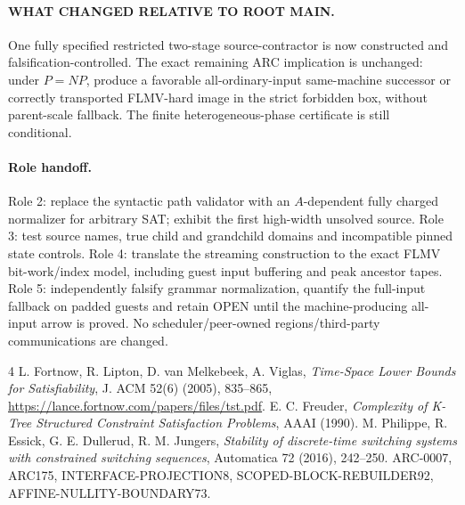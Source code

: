 \documentclass[11pt]{article}
\begin{document}
\paragraph{WHAT CHANGED RELATIVE TO ROOT MAIN.}
One fully specified restricted two-stage source-contractor is now
constructed and falsification-controlled. The exact remaining ARC
implication is unchanged: under $P=NP$, produce a favorable 
all-ordinary-input same-machine successor or correctly transported
FLMV-hard image in the strict forbidden box, without parent-scale fallback.
The finite heterogeneous-phase certificate is still conditional.

\paragraph{Role handoff.}
Role 2: replace the syntactic path validator with an $A$-dependent
fully charged normalizer for arbitrary SAT; exhibit the first
high-width unsolved source. Role 3: test source names, true child and
grandchild domains and incompatible pinned state controls. Role 4:
translate the streaming construction to the exact FLMV bit-work/index
model, including guest input buffering and peak ancestor tapes.
Role 5: independently falsify grammar normalization, quantify the
full-input fallback on padded guests and retain OPEN until the
machine-producing all-input arrow is proved. No scheduler/peer-owned
regions/third-party communications are changed.

\begin{thebibliography}{4}
 L. Fortnow, R. Lipton, D. van Melkebeek, A. Viglas,
\emph{Time-Space Lower Bounds for Satisfiability},
J. ACM 52(6) (2005), 835--865,
\url{https://lance.fortnow.com/papers/files/tst.pdf}.
 E. C. Freuder, \emph{Complexity of K-Tree Structured
Constraint Satisfaction Problems}, AAAI (1990).
 M. Philippe, R. Essick, G. E. Dullerud, R. M. Jungers,
\emph{Stability of discrete-time switching systems with constrained
switching sequences}, Automatica 72 (2016), 242--250.
 ARC-0007, ARC175, INTERFACE-PROJECTION8,
SCOPED-BLOCK-REBUILDER92, AFFINE-NULLITY-BOUNDARY73.
\end{thebibliography}
\end{document}
